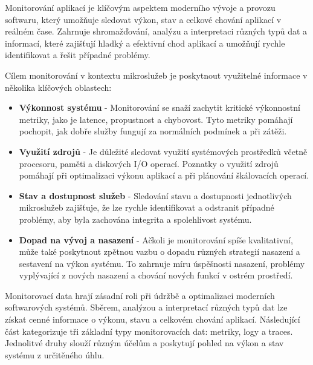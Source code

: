 


Monitorování aplikací je klíčovým aspektem moderního vývoje a provozu softwaru, který umožňuje sledovat výkon, stav a celkové chování aplikací v reálném čase. Zahrnuje shromažďování, analýzu a interpretaci různých typů dat a informací, které zajišťují hladký a efektivní chod aplikací a umožňují rychle identifikovat a řešit případné problémy. \cite{Majors2022}


Cílem monitorování v kontextu mikroslužeb je poskytnout využitelné informace v několika klíčových oblastech:

\begin {itemize}
    \item \textbf{Výkonnost systému} - Monitorování se snaží zachytit kritické výkonnostní metriky, jako je latence, propustnost a chybovost. Tyto metriky pomáhají pochopit, jak dobře služby fungují za normálních podmínek a při zátěži.
    \item \textbf{Využití zdrojů} - Je důležité sledovat využití systémových prostředků včetně procesoru, paměti a diskových I/O operací. Poznatky o využití zdrojů pomáhají při optimalizaci výkonu aplikací a při plánování škálovacích operací.
    \item \textbf{Stav a dostupnost služeb} - Sledování stavu a dostupnosti jednotlivých mikroslužeb zajišťuje, že lze rychle identifikovat a odstranit případné problémy, aby byla zachována integrita a spolehlivost systému.
    \item \textbf{Dopad na vývoj a nasazení} - Ačkoli je monitorování spíše kvalitativní, může také poskytnout zpětnou vazbu o dopadu různých strategií nasazení a sestavení na výkon systému. To zahrnuje míru úspěšnosti nasazení, problémy vyplývající z nových nasazení a chování nových funkcí v ostrém prostředí.
\end{itemize}


Monitorovací data hrají zásadní roli při údržbě a optimalizaci moderních softwarových systémů. Sběrem, analýzou a interpretací různých typů dat lze získat cenné informace o výkonu, stavu a celkovém chování aplikací. Následující část kategorizuje tři základní typy monitorovacích dat: metriky, logy a traces. Jednolitvé druhy slouží různým účelům a poskytují pohled na výkon a stav systému z určitěného úhlu. 

